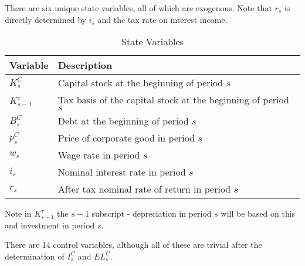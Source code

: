 There are six unique state variables, all of which are exogenous.  Note that $r_{s}$ is directly determined by $i_{s}$ and the tax rate on interest income.

\begin{table}[htbp]
  \centering
  \caption{State Variables}
    \begin{tabular}{ll}
    \hline
    \hline
    Variable & Description \\
    \hline
    $K^{C}_{s}$ & Capital stock at the beginning of period $s$ \\
    $K^{\tau}_{s-1}$ & Tax basis of the capital stock at the beginning of period $s$\\
    $B^{C}_{s}$ & Debt at the beginning of period $s$ \\
    $p^{C}_{s}$ & Price of corporate good in period $s$ \\
    $w_{s}$ & Wage rate in period $s$ \\
    $i_{s}$ & Nominal interest rate in period $s$ \\
    $r_{s}$ & After tax nominal rate of return in period $s$ \\
    \hline
    \hline
    \end{tabular}%
  \label{tab:state_vars}%
\end{table}%

Note in $K^{\tau}_{s-1}$ the $s-1$ subscript - depreciation in period $s$ will be based on this and investment in period $s$.

There are 14 control variables, although all of these are trivial after the determination of $I^{C}_{s}$ and $EL^{C}_{s}$.

